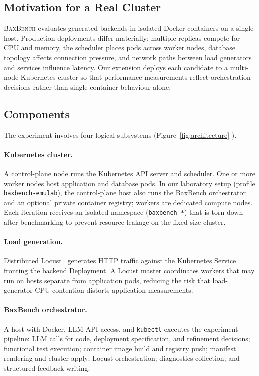 \subsection{Motivation for a Real Cluster}

\textsc{BaxBench} evaluates generated backends in isolated Docker containers on
a single host.  Production deployments differ materially: multiple replicas
compete for CPU and memory, the scheduler places pods across worker nodes,
database topology affects connection pressure, and network paths between load
generators and services influence latency.  Our extension deploys each
candidate to a multi-node Kubernetes cluster so that performance measurements
reflect orchestration decisions rather than single-container behaviour alone.

\subsection{Components}

The experiment involves four logical subsystems (Figure~\ref{fig:architecture}
).

\paragraph{Kubernetes cluster.}
A control-plane node runs the Kubernetes API server and scheduler.  One or more
worker nodes host application and database pods.  In our laboratory setup
(profile \texttt{baxbench-emulab}), the control-plane host also runs the
BaxBench orchestrator and an optional private container registry; workers are
dedicated compute nodes.  Each iteration receives an isolated namespace
(\texttt{baxbench-*}) that is torn down after benchmarking to prevent resource
leakage on the fixed-size cluster.

\paragraph{Load generation.}
Distributed Locust~\cite{locust} generates HTTP traffic against the Kubernetes
Service fronting the backend Deployment.  A Locust master coordinates workers
that may run on hosts separate from application pods, reducing the risk that
load-generator CPU contention distorts application measurements.

\paragraph{BaxBench orchestrator.}
A host with Docker, LLM API access, and \texttt{kubectl} executes the
experiment pipeline: LLM calls for code, deployment specification, and
refinement decisions; functional test execution; container image build and
registry push; manifest rendering and cluster apply; Locust orchestration;
diagnostics collection; and structured feedback writing.

